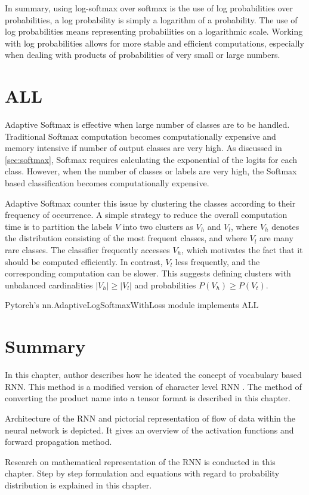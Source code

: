 In summary, using log-softmax over softmax is the use of log probabilities over probabilities, a log probability is simply a logarithm of a probability. The use of log probabilities means representing probabilities on a logarithmic scale. Working with log probabilities allows for more stable and efficient computations, especially when dealing with products of probabilities of very small or large numbers. 


\section{\acf{ALL}}

Adaptive Softmax \parencite{Grave.14092016} is effective when large number of classes are to be handled. Traditional Softmax computation becomes computationally expensive and memory intensive if number of output classes are very high. As discussed in  \ref{sec:softmax}, Softmax requires calculating the exponential of the logits for each class. However, when the number of classes or labels are very high, the Softmax based classification becomes computationally expensive.



Adaptive Softmax \parencite{Grave.14092016} counter this issue by clustering the classes according to their frequency of occurrence. A simple strategy to reduce the overall computation time is to partition the labels \(V\) into two clusters as \(V_h\) and \(V_l\), where \(V_h\) denotes the distribution consisting of the most frequent classes, and where \(V_l\) are many rare classes. The classifier frequently accesses \(V_h\), which motivates the fact that it should be computed efficiently. In contrast,  \(V_l\) less frequently, and the corresponding computation can be slower. This suggests defining clusters with unbalanced cardinalities \(|V_h| \geq |V_l|\) and probabilities \(P(V_h) \geq P(V_t)\).

Pytorch's \parencite{Paszke.03122019} nn.AdaptiveLogSoftmaxWithLoss module implements \acf{ALL}


\section{Summary}

In this chapter, author describes how he ideated the concept of vocabulary based RNN. This method is a modified version of character level RNN \parencite{sean}. The method of converting the product name into a tensor format is described in this chapter. 

Architecture of the RNN and pictorial representation of flow of data within the neural network is depicted. It gives an overview of the activation functions and forward propagation method. 

Research on mathematical representation of the RNN  is conducted in this chapter. Step by step formulation and equations with regard to probability distribution is explained in this chapter.